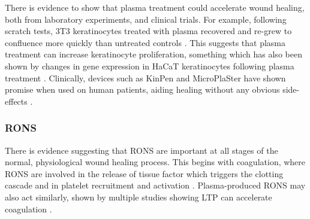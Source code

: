 \documentclass[11pt, oneside]{article}   	%
\newcommand{\toref}[1]{ \textcolor{blue}{\bf{REFERENCE #1}}}
\begin{document}
There is evidence to show that plasma treatment could accelerate wound healing, both from laboratory experiments, and clinical trials.
For example, following scratch tests, 3T3 keratinocytes treated with plasma recovered and re-grew to confluence more quickly than untreated controls \cite{Tipa2011plasma}.
This suggests that plasma treatment can increase keratinocyte proliferation, something which has also been shown by changes in gene expression in HaCaT keratinocytes following plasma treatment \cite{Barton2013nonthermal}.
Clinically, devices such as KinPen and MicroPlaSter have shown promise when used on human patients, aiding healing without any obvious side-effects \cite{Isbary2013cold, Isbary2012successful, Isbary2010a, Bekeschus2016the}.





\subsubsection{RONS}
There is evidence suggesting that RONS are important at all stages of the normal, physiological wound healing process.
This begins with coagulation, where RONS are involved in the release of tissue factor which triggers the clotting cascade and in platelet recruitment and activation \cite{Soneja2005role}.
Plasma-produced RONS may also act similarly, shown by multiple studies showing LTP can accelerate coagulation \cite{Fridman2006blood, Chen2009blood}.

\end{document}
